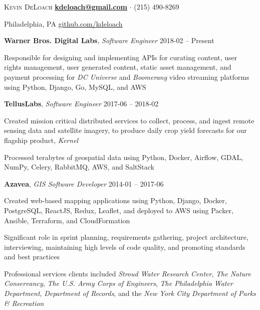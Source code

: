 \documentclass[12pt,a4paper]{article}
\newcommand{\sectionhead}{\normalfont\normalsize\scshape}
\newcommand{\workhead}[3]{\textbf{#1}, \emph{#2} \hfill #3}
\newcommand{\li}{\item[--]}
\begin{document}
\noindent
{\huge \textsc{Kevin DeLoach}}
\hfill
\href{mailto:kdeloach@gmail.com}{\bfseries kdeloach@gmail.com}
$\cdot$
(215) 490-8269

\noindent
{\sc Philadelphia, PA}
\hfill
\href{https://github.com/kdeloach}{github.com/kdeloach}

\begin{description}[leftmargin=0em]
    \itemsep0pt
    \parskip3pt
    \item
        \workhead{Warner Bros. Digital Labs}{Software Engineer}{2018-02 -- Present}
        \begin{itemize*}
            \li Responsible for designing and implementing APIs for curating content, user rights management, user generated content, static asset management, and payment processing for \emph{DC Universe} and \emph{Boomerang} video streaming platforms using Python, Django, Go, MySQL, and AWS
        \end{itemize*}
    \item
        \workhead{TellusLabs}{Software Engineer}{2017-06 -- 2018-02}
        \begin{itemize*}
            \li Created mission critical distributed services to collect, process, and ingest remote sensing data and satellite imagery, to produce daily crop yield forecasts for our flagship product, \emph{Kernel}
            \li Processed terabytes of geospatial data using Python, Docker, Airflow, GDAL, NumPy, \mbox{Celery}, RabbitMQ, AWS, and SaltStack
        \end{itemize*}
    \item
        \workhead{Azavea}{GIS Software Developer}{2014-01 -- 2017-06}
        \begin{itemize*}
            \li Created web-based mapping applications using Python, Django, Docker, PostgreSQL, \mbox{ReactJS}, Redux, Leaflet, and deployed to AWS using Packer, Ansible, Terraform, and CloudFormation
            \li Significant role in sprint planning, requirements gathering, project architecture, interviewing, maintaining high levels of code quality, and promoting standards and best practices
            \li Professional services clients included \emph{Stroud Water Research Center}, \emph{The Nature Conservancy}, \emph{The U.S. Army Corps of Engineers}, \emph{The Philadelphia Water Department}, \emph{Department of Records}, and the \emph{New York City Department of Parks \& Recreation}

\end{itemize*}
\end{description}
\end{document}
